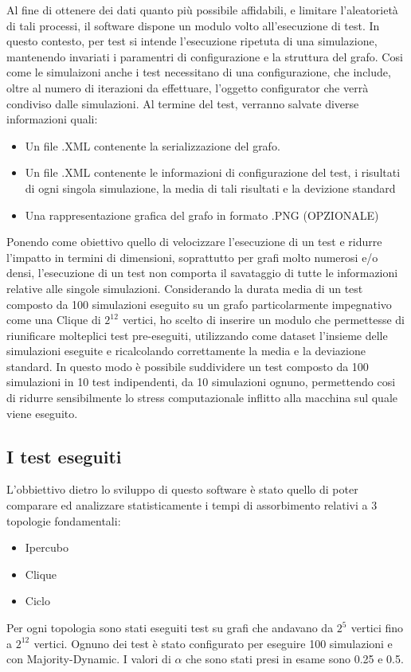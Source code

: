 \documentclass{article}
\begin{document}
Al fine di ottenere dei dati quanto più possibile affidabili, e limitare l'aleatorietà di tali processi, il software dispone un modulo volto all'esecuzione di test. In questo contesto, per test si intende l'esecuzione ripetuta di una simulazione, mantenendo invariati i paramentri di configurazione e la struttura del grafo. Cosi come le simulaizoni anche i test necessitano di una configurazione, che include, oltre al numero di iterazioni da effettuare, l'oggetto configurator che verrà condiviso dalle simulazioni.\newline
Al termine del test, verranno salvate diverse informazioni quali:
\begin{itemize}
\item Un file .XML contenente la serializzazione del grafo.
\item Un file .XML contenente le informazioni di configurazione del test, i risultati di ogni singola             simulazione, la media di tali risultati e la devizione standard
\item Una rappresentazione grafica del grafo in formato .PNG (OPZIONALE)
\end{itemize}
\newline
Ponendo come obiettivo quello di velocizzare l'esecuzione di un test e ridurre l'impatto in termini di dimensioni, soprattutto per grafi molto numerosi e/o densi, l'esecuzione di un test non comporta il savataggio di tutte le informazioni relative alle singole simulazioni.
Considerando la durata media di un test composto da 100 simulazioni eseguito su un grafo particolarmente  impegnativo come una Clique di $2^{12^{\mathrm{}}}$ vertici, ho scelto di inserire un modulo che permettesse di riunificare molteplici test pre-eseguiti, utilizzando come dataset l'insieme delle simulazioni eseguite e ricalcolando correttamente la media e la deviazione standard. \newline
In questo modo è possibile suddividere un test composto da 100 simulazioni in 10 test indipendenti, da 10 simulazioni ognuno, permettendo cosi di ridurre sensibilmente lo stress computazionale inflitto alla macchina sul quale viene eseguito.


\subsection{I test eseguiti}
 L'obbiettivo dietro lo sviluppo di questo software è stato quello di poter comparare ed analizzare statisticamente i tempi di assorbimento relativi a 3 topologie fondamentali:
 \begin{itemize}
\item Ipercubo
\item Clique
\item Ciclo
\end{itemize}
\newline
Per ogni topologia sono stati eseguiti test su grafi che andavano da $2^{5^{\mathrm{}}}$ vertici fino a $2^{12^{\mathrm{}}}$ vertici.\newline
Ognuno dei test è stato configurato per eseguire 100 simulazioni e con  Majority-Dynamic. \newline
I valori di $\alpha$ che sono stati presi in esame sono 0.25 e 0.5.
\end{document}
